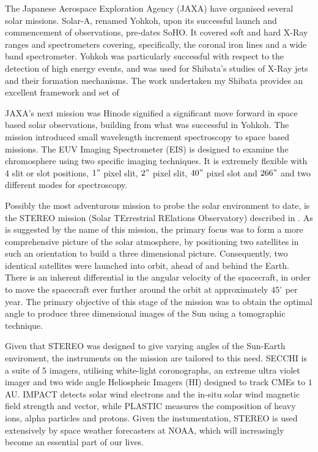 The Japanese Aerospace Exploration Agency (JAXA) have organised several solar missions.
Solar-A, renamed Yohkoh, \cite{Tsuneta1991} upon its successful launch and commencement of observations, pre-dates SoHO.
It covered soft and hard X-Ray ranges and spectrometers covering, specifically, the coronal iron lines and a wide band spectrometer. 
Yohkoh was particularly successful with respect to the detection of high energy events, and was used for Shibata's studies of X-Ray jets and their formation mechanisms.
The work undertaken my Shibata provides an excellent framework and set of 
 
JAXA's next mission was Hinode signified a significant move forward in space based solar observations, building from what was successful in Yohkoh.
The mission introduced small wavelength increment spectroscopy to space based missions.
The EUV Imaging Spectrometer (EIS) is designed to examine the chromosphere using two specific imaging techniques.
It is extremely flexible with 4 slit or slot positions, $1"$ pixel slit, $2"$ pixel slit, $40"$ pixel slot and $266"$ and two different modes for spectroscopy.

Possibly the most adventurous mission to probe the solar environment to date, is the STEREO mission (Solar TErrestrial RElations Observatory) described in \cite{Kaiser2008}.
As is suggested by the name of this mission, the primary focus was to form a more comprehensive picture of the solar atmosphere, by positioning two satellites in such an orientation to build a three dimensional picture.
Consequently, two identical satellites were launched into orbit, ahead of and behind the Earth.
There is an inherent differential in the angular velocity of the spacecraft, in order to move the spacecraft ever further around the orbit at approximately $45^\circ$ per year.
The primary objective of this stage of the mission was to obtain the optimal angle to produce three dimensional images of the Sun using a tomographic technique.

Given that STEREO was designed to give varying angles of the Sun-Earth  enviroment, the instruments on the mission are tailored to this need.
SECCHI is a suite of 5 imagers, utilising white-light coronographs, an extreme ultra violet imager and two wide angle Heliospheic Imagers (HI) designed to track CMEs to $1$ AU.
IMPACT detects solar wind electrons and the in-situ solar wind magnetic field strength and vector, while PLASTIC measures the composition of heavy ions, alpha particles and protons. 
Given the instumentation, STEREO is used extensively by space weather forecasters at NOAA, which will increasingly become an essential part of our lives.

